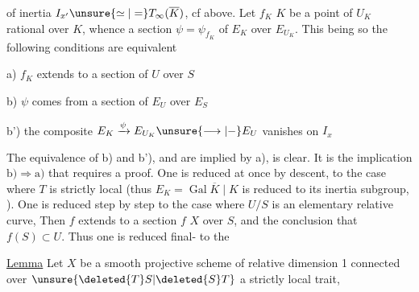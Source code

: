 of inertia $I_{x'}\unsure{\simeq|=}T_\infty(\overline K)$, cf above. Let $f_K$ $K$ be a point of $U_K$ rational over $K$, whence a section $\psi=\psi_{f_K}$ of $E_K$ over $E_{U_K}$. This being so the following conditions are equivalent

\noindent a) $f_K$ extends to a section of $U$ over $S$

\noindent b) $\psi$ comes from a section of $E_U$ over $E_S$

\noindent b') the composite $E_K\xrightarrow{\psi}E_{U_K}\unsure{\longrightarrow|-}E_U$ vanishes on $I_x$


The equivalence of b) and b'), and  are implied by a), is clear. It is the implication $\mathrm{b)}\Longrightarrow\mathrm{a)}$ that requires a proof. One is reduced at once\unsure{,} by descent, to the case  where $T$ is strictly local (thus $E_K=\operatorname{Gal}\overline K\mid K$ is reduced to its inertia subgroup, ). One is reduced step by step to the case where $U/S$ is an elementary relative curve,   \unsure{\deleted{,}|,}  Then $f$ extends to a section $f$   $X$ over $S$, and the conclusion  that $f(S)\subset U$. Thus one is reduced final-\newline {} to the

\uline{Lemma} Let $X$ be a smooth projective scheme of relative dimension 1 connected over $\unsure{\deleted{T}S|\deleted{S}T}$ a strictly local trait,
